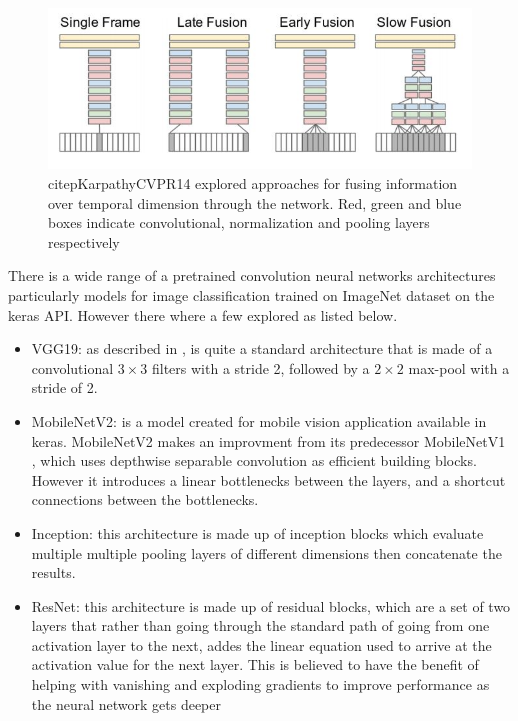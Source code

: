 \documentclass[10pt,phd,a4paper,oneside]{article}
\begin{document}
    \begin{figure}
        \includegraphics[width=\linewidth]{K_models.JPG}
        \caption{citep{KarpathyCVPR14} explored approaches for fusing information over
        temporal dimension through the network. Red, green and
        blue boxes indicate convolutional, normalization and pooling layers respectively \citep{KarpathyCVPR14}}
        \label{fig:k_models}
    \end{figure}
    There is a wide range of a pretrained convolution neural networks architectures particularly models for image classification trained on ImageNet dataset on the keras API. However there where a few explored as listed below.
    \begin{itemize}
        \item VGG19: as described in \citep{simonyan2014deep}, is quite a standard architecture that is made of a convolutional $3 \times3$ filters with a stride 2, followed by a $2\times2$ max-pool with a stride of 2.
        \item MobileNetV2: is a model created for mobile vision application available in keras. MobileNetV2\cite{Sandler_2018} makes an improvment from its predecessor MobileNetV1 \citep{howard2017mobilenets}, which uses depthwise separable convolution as efficient building blocks. However it introduces a linear bottlenecks between the layers, and a shortcut connections between the bottlenecks.
        \item Inception: this architecture \citep{Szegedy_2016} is made up of inception blocks which evaluate multiple multiple pooling layers of different dimensions then concatenate the results.
        \item ResNet: this architecture \citep{He_2016} is made up of residual blocks, which are a set of two layers that rather than going through the standard path of going from one activation layer to the next, addes the linear equation used to arrive at the activation value for the next layer. This is believed to have the benefit of helping with vanishing and exploding gradients to improve performance as the neural network gets deeper
    \end{itemize}
\end{document}
